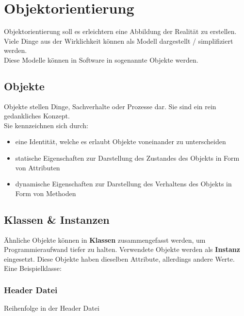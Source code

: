 \section{Objektorientierung}

Objektorientierung soll es erleichtern eine Abbildung der Realität zu erstellen. 
Viele Dinge aus der Wirklichkeit können als Modell dargestellt / simplifiziert werden.\\
Diese Modelle können in Software in sogenannte Objekte  werden.

\subsection{Objekte}

Objekte stellen Dinge, Sachverhalte oder Prozesse dar. Sie sind ein rein gedankliches Konzept.\\
Sie kennzeichnen sich durch:

\begin{itemize}[itemsep=1pt, parsep=0pt]
    \item eine Identität, welche es erlaubt Objekte voneinander zu unterscheiden
    \item statische Eigenschaften zur Darstellung des Zustandes des Objekts in Form von Attributen
    \item dynamische Eigenschaften zur Darstellung des Verhaltens des Objekts in Form von Methoden
\end{itemize}

\nextcol

\subsection{Klassen \& Instanzen}

Ähnliche Objekte können in \textbf{Klassen} zusammengefasst werden, um Programmieraufwand tiefer zu halten. 
Verwendete Objekte werden als \textbf{Instanz} eingesetzt. Diese Objekte haben dieselben Attribute, allerdings andere Werte.\\
Eine Beispielklasse:\\



\subsubsection{Header Datei}

Reihenfolge in der Header Datei

